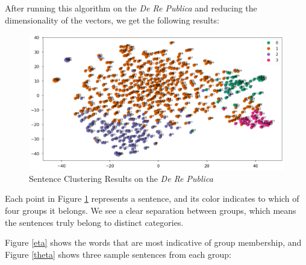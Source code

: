 \documentclass[a4paper, 12pt,notitlepage]{article} %
\newenvironment{figurecenter}{%
	\setlength\topsep{-7pt}
	\setlength\parskip{-7pt}
	\singlespacing %
	\begin{center}
	}{%
	\end{center}
\vspace{-5pt}
}
\numberwithin{dummy}{subsection}
\numberwithin{dummy}{section}
\theoremstyle{named}
\theoremstyle{definition}
\theoremstyle{definition}
\begin{document}
After running this algorithm on the \textit{De Re Publica} and reducing the dimensionality of the vectors, we get the following results:

\begin{figure}[H]
	\begin{figurecenter}
	\includegraphics[scale=0.7]{image14.png}
	\caption{Sentence Clustering Results on the \textit{De Re Publica}}
	\label{zeta}
	\end{figurecenter}
\end{figure}

\noindent Each point in Figure \ref{zeta} represents a sentence, and its color indicates to which of four groups it belongs. We see a clear separation between groups, which means the sentences truly belong to distinct categories.

Figure \ref{eta} shows the words that are most indicative of group membership, and Figure \ref{theta} shows three sample sentences from each group:
\end{document}
